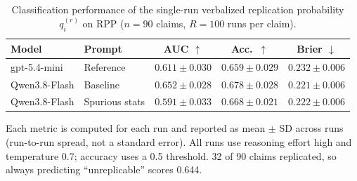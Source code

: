 \begin{table}[ht]
  \centering
  \small
  \caption{Classification performance of the single-run verbalized replication probability $q_i^{(r)}$ on RPP
    ($n=90$ claims, $R=100$ runs per claim).}
  \label{tab:classification_q_qwen}
  \begin{tabular}{@{}llccc@{}}
    \toprule
    Model & Prompt & AUC $\uparrow$ & Acc.\ $\uparrow$ & Brier $\downarrow$\\
    \midrule
    gpt-5.4-mini  & Reference      & $0.611 \pm 0.030$ & $0.659 \pm 0.029$ & $0.232 \pm 0.006$\\
    Qwen3.8-Flash & Baseline       & $0.652 \pm 0.028$ & $0.678 \pm 0.028$ & $0.221 \pm 0.006$\\
    Qwen3.8-Flash & Spurious stats & $0.591 \pm 0.033$ & $0.668 \pm 0.021$ & $0.222 \pm 0.006$\\
    \bottomrule
  \end{tabular}

  \smallskip
  \parbox{\linewidth}{\footnotesize
    Each metric is computed for each run and reported as mean $\pm$ SD across runs (run-to-run spread, not a standard
    error). All runs use reasoning effort high and temperature 0.7; accuracy uses a 0.5 threshold. 32 of 90 claims
    replicated, so always predicting ``unreplicable'' scores 0.644.}
\end{table}
